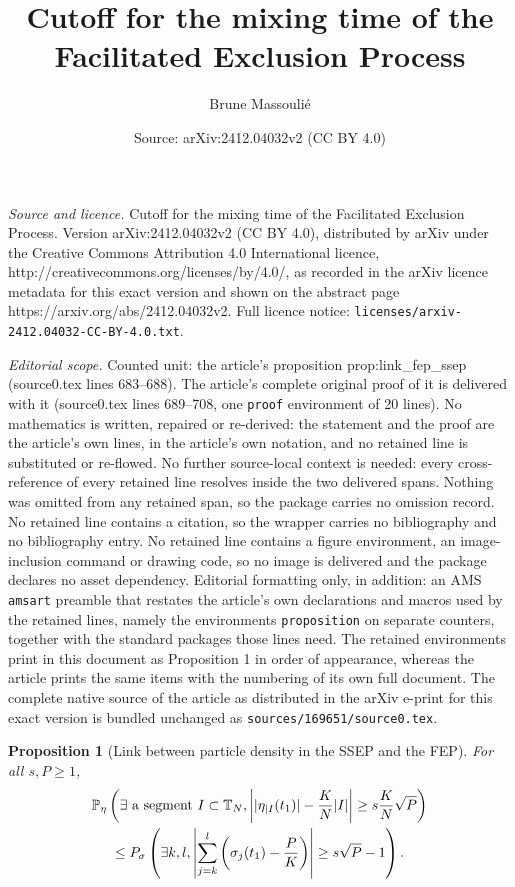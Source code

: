 \documentclass[10pt,a4paper]{amsart}
\title{Cutoff for the mixing time of the Facilitated Exclusion Process}
\author{Brune Massouli\'e}
\date{Source: arXiv:2412.04032v2 (CC BY 4.0)}
\newtheorem{proposition}{Proposition}
\newcommand{\PP}{\mathbb{P}}
\newcommand{\T}{\mathbb{T}}
\newcommand{\bP}{\textbf{P}}
\begin{document}
\maketitle

\noindent\emph{Source and licence.} Cutoff for the mixing time of the Facilitated Exclusion Process. Version arXiv:2412.04032v2 (CC BY 4.0), distributed by arXiv under the Creative Commons Attribution 4.0 International licence, http://creativecommons.org/licenses/by/4.0/, as recorded in the arXiv licence metadata for this exact version and shown on the abstract page https://arxiv.org/abs/2412.04032v2. Full licence notice: \texttt{licenses/arxiv-2412.04032-CC-BY-4.0.txt}.\par\smallskip

\noindent\textit{Editorial scope.} Counted unit: the article's proposition prop:link\_fep\_ssep (source0.tex lines 683--688). The article's complete original proof of it is delivered with it (source0.tex lines 689--708, one \texttt{proof} environment of 20 lines). No mathematics is written, repaired or re-derived: the statement and the proof are the article's own lines, in the article's own notation, and no retained line is substituted or re-flowed.  No further source-local context is needed: every cross-reference of every retained line resolves inside the two delivered spans.  Nothing was omitted from any retained span, so the package carries no omission record.  No retained line contains a citation, so the wrapper carries no bibliography and no bibliography entry.  No retained line contains a figure environment, an image-inclusion command or drawing code, so no image is delivered and the package declares no asset dependency.  Editorial formatting only, in addition: an AMS \texttt{amsart} preamble that restates the article's own declarations and macros used by the retained lines, namely the environments \texttt{proposition} on separate counters, together with the standard packages those lines need.  The retained environments print in this document as Proposition 1 in order of appearance, whereas the article prints the same items with the numbering of its own full document.  The complete native source of the article as distributed in the arXiv e-print for this exact version is bundled unchanged as \texttt{sources/169651/source0.tex}.
\begin{proposition}[Link between particle density in the SSEP and the FEP] \label{prop:link_fep_ssep}
For all $s, P \ge 1$,
\begin{multline}
\PP_\eta\left(\exists \hbox{ a segment } I \subset \T_N,  \left||\eta_{|I}(t_1) | - \frac{K}{N} |I|\right| \ge s \frac{K}{N} \sqrt{P}\right) \\ \le \textnormal{\bP}_\sigma\left(\exists k,l, \left|\sum_{j=k}^{l} \left(\sigma_j(t_1) - \frac{P}{K} \right) \right|\ge s\sqrt{P} -1\right).
\end{multline}
\end{proposition}
\end{document}
